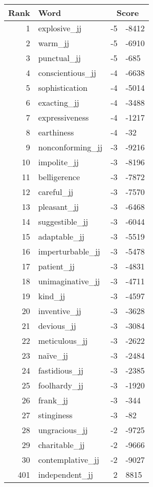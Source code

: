 \begin{longtable}[!htbp]{| rlr@{.}l |}
    \hline
    \textbf{Rank} & \textbf{Word} & \multicolumn{2}{c|}{\textbf{Score}} \\
    \hline
    \endhead
    1 & explosive\_jj & -5 & -8412 \\
    2 & warm\_jj & -5 & -6910 \\
    3 & punctual\_jj & -5 & -685 \\
    4 & conscientious\_jj & -4 & -6638 \\
    5 & sophistication & -4 & -5014 \\
    6 & exacting\_jj & -4 & -3488 \\
    7 & expressiveness & -4 & -1217 \\
    8 & earthiness & -4 & -32 \\
    9 & nonconforming\_jj & -3 & -9216 \\
    10 & impolite\_jj & -3 & -8196 \\
    11 & belligerence & -3 & -7872 \\
    12 & careful\_jj & -3 & -7570 \\
    13 & pleasant\_jj & -3 & -6468 \\
    14 & suggestible\_jj & -3 & -6044 \\
    15 & adaptable\_jj & -3 & -5519 \\
    16 & imperturbable\_jj & -3 & -5478 \\
    17 & patient\_jj & -3 & -4831 \\
    18 & unimaginative\_jj & -3 & -4711 \\
    19 & kind\_jj & -3 & -4597 \\
    20 & inventive\_jj & -3 & -3628 \\
    21 & devious\_jj & -3 & -3084 \\
    22 & meticulous\_jj & -3 & -2622 \\
    23 & naïve\_jj & -3 & -2484 \\
    24 & fastidious\_jj & -3 & -2385 \\
    25 & foolhardy\_jj & -3 & -1920 \\
    26 & frank\_jj & -3 & -344 \\
    27 & stinginess & -3 & -82 \\
    28 & ungracious\_jj & -2 & -9725 \\
    29 & charitable\_jj & -2 & -9666 \\
    30 & contemplative\_jj & -2 & -9027 \\
    401 & independent\_jj & 2 & 8815 \\

\end{longtable}
